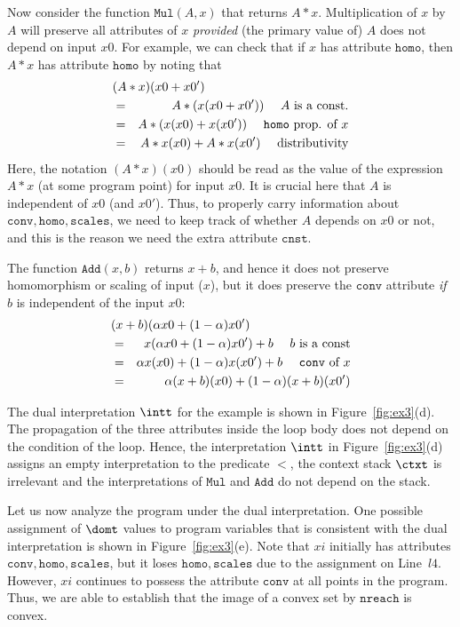\documentclass[preprint]{sig-alternate-05-2015}
\def\nreach{{\mathtt{nreach}}}
\def\MMul{{\mathtt{Mul}}}
\def\VAdd{{\mathtt{Add}}}
\def\conv{{\mathtt{conv}}}
\def\scales{{\mathtt{scales}}}
\def\homo{{\mathtt{homo}}}
\def\cnst{{\mathtt{cnst}}}
\begin{document}
{Now consider the function $\MMul(A,x)$ that returns $A*x$.
Multiplication of $x$ by $A$ will preserve all attributes of
$x$ {\em{provided}} (the primary value of) $A$ does not depend
on input $x0$. For example, we can check that if
$x$ has attribute $\homo$, then $A*x$ has attribute $\homo$ by noting
that
\begin{eqnarray*}
  \lefteqn{(A*x)(x0+x0')} & &
                       \\ & = & A*(x(x0+x0'))
  \quad\mbox{ $A$ is a const.}
             \\ & = & A*(x(x0)+x(x0'))
  \quad\mbox{ $\homo$ prop. of $x$}
  \\ & = & A*x(x0)+A*x(x0')
  \quad\mbox{ distributivity}
\end{eqnarray*}
Here, the notation $(A*x)(x0)$ should be read as the
value of the expression $A*x$ (at some program point)
for input $x0$.
It is crucial here that $A$ is independent of $x0$ (and $x0'$).
Thus, to properly carry information about $\conv,\homo,\scales$,
we need to keep track of whether
$A$ depends on $x0$ or not, and this is the reason we need the
extra attribute $\cnst$.

The function $\VAdd(x,b)$ returns $x+b$, and hence it does
not preserve homomorphism or scaling of input ($x$), but it
does preserve the $\conv$ attribute {\em{if}} $b$ is
independent of the input $x0$:
\begin{eqnarray*}
  \lefteqn{(x+b)(\alpha x0 + (1-\alpha)x0')} & &
                                          \\ & = &
  x(\alpha x0 + (1-\alpha)x0') + b
  \quad\mbox{ $b$ is a const}
  \\ & = &
  \alpha x(x0) + (1-\alpha) x(x0') + b
  \quad\mbox{ $\conv$ of $x$}
  \\ & = &
  \alpha (x+b)(x0) + (1-\alpha) (x+b)(x0')
\end{eqnarray*}

The dual interpretation $\intt$ for the example is shown in
Figure~\ref{fig:ex3}(d).
The propagation of the three attributes inside the loop body
does not depend on the condition of the loop. Hence, the
interpretation $\intt$ in Figure~\ref{fig:ex3}(d) assigns an
empty interpretation to the predicate $<$, the context stack
$\ctxt$ is irrelevant and the interpretations of
$\MMul$ and $\VAdd$ do not depend on the stack.

Let us now analyze the program under the dual interpretation.
One possible assignment of $\domt$ values to program
variables that is consistent with the dual interpretation
is shown in Figure~\ref{fig:ex3}(e).
Note that $xi$ initially has attributes
$\conv,\homo,\scales$, but it loses $\homo,\scales$
due to the assignment on Line~$l4$. However, $xi$ continues
to possess the attribute $\conv$ at all points in the program.
Thus, we are able to establish that the image of a convex set
by $\nreach$ is convex.


}
\end{document}

